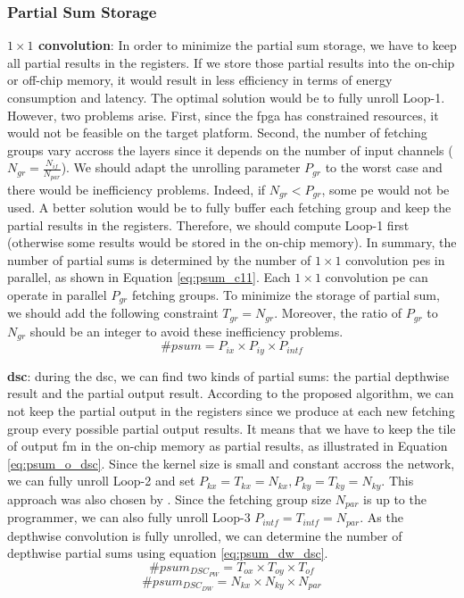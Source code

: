 \subsubsection{Partial Sum Storage}
%
\textbf{$1 \times 1$ convolution}: In order to minimize the partial sum storage, we have to keep all partial results in the registers. If we store those partial results into the on-chip or off-chip memory, it would result in less efficiency in terms of energy consumption and latency. The optimal solution would be to fully unroll Loop-1. However, two problems arise. First, since the \acrshort{fpga} has constrained resources, it would not be feasible on the target platform. Second, the number of fetching groups vary accross the layers since it depends on the number of input channels ($N_{gr} = \frac{N_{if}}{N_{par}}$). We should adapt the unrolling parameter $P_{gr}$ to the worst case and there would be inefficiency problems. Indeed, if $N_{gr} < P_{gr}$, some \acrshort{pe} would not be used. A better solution would be to fully buffer each fetching group and keep the partial results in the registers. Therefore, we should compute Loop-1 first (otherwise some results would be stored in the on-chip memory).
In summary, the number of partial sums is determined by the number of $1 \times 1$ convolution \acrshort{pe}s in parallel, as shown in Equation \eqref{eq:psum_c11}. Each $1 \times 1$ convolution \acrshort{pe} can operate in parallel $P_{gr}$ fetching groups. To minimize the storage of partial sum, we should add the following constraint $T_{gr} = N_{gr}$. Moreover, the ratio of $P_{gr}$ to $N_{gr}$ should be an integer to avoid these inefficiency problems.
%
\begin{equation}
    \# psum = P_{ix} \times P_{iy} \times P_{intf}
    \label{eq:psum_c11}
\end{equation}

\textbf{\acrshort{dsc}}: during the \acrshort{dsc}, we can find two kinds of partial sums: the partial depthwise result and the partial output result. According to the proposed algorithm, we can not keep the partial output in the registers since we produce at each new fetching group every possible partial output results. It means that we have to keep the tile of output \acrshort{fm} in the on-chip memory as partial results, as illustrated in Equation \eqref{eq:psum_o_dsc}. Since the kernel size is small and constant accross the network, we can fully unroll Loop-2 and set $P_{kx} = T_{kx} = N_{kx}, P_{ky} = T_{ky} = N_{ky}$. This approach was also chosen by \textcite{motamedi_placid_2017}. Since the fetching group size $N_{par}$ is up to the programmer, we can also fully unroll Loop-3 $P_{intf} = T_{intf} = N_{par}$. As the depthwise convolution is fully unrolled, we can determine the number of depthwise partial sums using equation \ref{eq:psum_dw_dsc}.
%
\begin{equation}
    \# psum_{DSC_{PW}} = T_{ox} \times T_{oy} \times T_{of}
    \label{eq:psum_o_dsc}
\end{equation}
%
\begin{equation}
    \# psum_{DSC_{DW}} = N_{kx} \times N_{ky} \times N_{par}
    \label{eq:psum_dw_dsc}
\end{equation}
%
